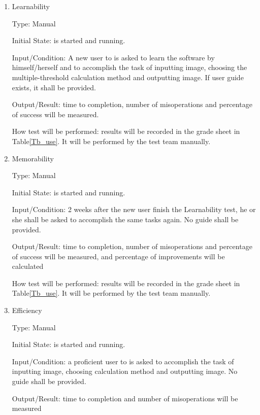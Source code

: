 \documentclass[12pt, titlepage]{article}
\begin{document}
\begin{enumerate}

\item{Learnability}

Type: Manual
					
Initial State: \progname{} is started and running.
					
Input/Condition: A new user to \progname{} is asked to learn the software by
himself/herself and to accomplish the task of inputting image, choosing the
multiple-threshold
calculation method and outputting image. If user guide exists, it shall be
provided. 
				
Output/Result: time to completion, number of misoperations and percentage of
success will be measured.
					
How test will be performed: results will be recorded in the grade sheet in
Table\ref{Tb_use}. It will be performed by the test team manually.

\item{Memorability}

Type: Manual
					
Initial State: \progname{} is started and running.
					
Input/Condition: 2 weeks after the new user finish the Learnability test, he or
she shall be asked to accomplish the same tasks again. No guide shall be
provided.
					
Output/Result: time to completion, number of misoperations and percentage of
success will be measured, and percentage of improvements will be calculated
					
How test will be performed: results will be recorded in the grade sheet in
Table\ref{Tb_use}. It will be performed by the test team manually.
					
\item{Efficiency}

Type: Manual
					
Initial State: \progname{} is started and running.
					
Input/Condition: a proficient user to \progname{} is asked to accomplish the
task of inputting image, choosing calculation method and outputting image. No
guide shall be provided.
					
Output/Result: time to completion and number of misoperations will be measured
					

\end{enumerate}
\end{document}
